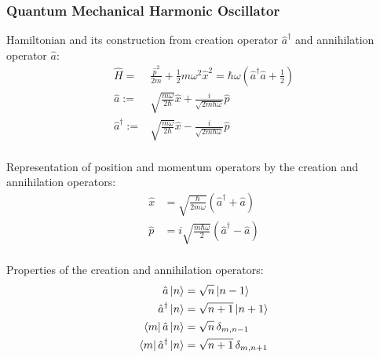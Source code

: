 		\subsubsection{Quantum Mechanical Harmonic Oscillator}
			\noindent
			Hamiltonian and its construction from creation operator $\hat{a}^\dagger$ and annihilation operator $\hat{a}$:
			\begin{equation}
				\begin{aligned}
					\hat{H} =& \frac{\hat{p}^2}{2m} + \frac{1}{2}m\omega^2 \hat{x}^2 = \hbar\omega(\hat{a}^\dagger \hat{a} + \frac{1}{2}) \\
					\hat{a} :=& \sqrt{\frac{m\omega}{2\hbar}}\hat{x} + \frac{i}{\sqrt{2m\hbar\omega}}\hat{p} \\
					\hat{a}^\dagger :=& \sqrt{\frac{m\omega}{2\hbar}}\hat{x} - \frac{i}{\sqrt{2m\hbar\omega}}\hat{p} \\
				\end{aligned}
			\end{equation}

			\noindent
			Representation of position and momentum operators by the creation and annihilation operators:
			\begin{equation}
				\begin{aligned}
					\hat{x} &= \sqrt{\frac{\hbar}{2m\omega}}\left(\hat{a}^\dagger + \hat{a} \right) \\
					\hat{p} &= i\sqrt{\frac{m\hbar\omega}{2}}\left(\hat{a}^\dagger - \hat{a} \right) \\
				\end{aligned}
			\end{equation}

			\noindent
			Properties of the creation and annihilation operators:
			\begin{equation}
				\begin{aligned}
					\hat{a}\Ket{n} &= \sqrt{n}\Ket{n-1} \\
					\hat{a}^\dagger\Ket{n} &= \sqrt{n+1}\Ket{n+1} \\
					\Bra{m}\hat{a}\Ket{n} &= \sqrt{n} \,\delta_{m,n-1} \\
					\Bra{m}\hat{a}^\dagger\Ket{n} &= \sqrt{n+1} \,\delta_{m,n+1} \\
				\end{aligned}
			\end{equation}

